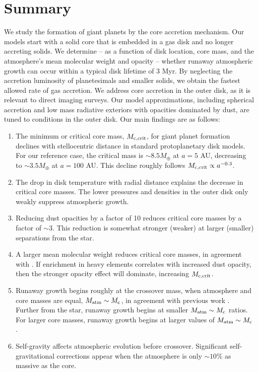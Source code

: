 \documentclass[apj, numberedappendix]{emulateapj}
\newcommand{\co}{_{\rm c}}
\def\crit{_{\rm{c, crit}}}
\begin{document}
\section{Summary} \label{sec:conclusions}

We study the formation of giant planets by the core accretion mechanism.  Our models start with a solid core that is embedded in a gas disk and no longer accreting solids.  We determine -- as a function of disk location, core mass, and the atmosphere's mean molecular weight and opacity -- whether runaway atmospheric growth can occur within a typical disk lifetime of 3 Myr.  By neglecting the accretion luminosity of planetesimals and smaller solids, we obtain the fastest allowed rate of gas accretion.  We address core accretion in the outer disk, as it is relevant to direct imaging surveys.  Our model approximations, including spherical accretion and low mass radiative exteriors with opacities dominated by dust, are tuned to conditions in the outer disk.   Our main findings are as follows:

\begin{enumerate}
\item The minimum or critical core mass, $M\crit$, for giant planet formation declines with stellocentric distance in standard protoplanetary disk models.  For our reference case, the critical mass is $\sim$$8.5 M_{\oplus}$ at $a = 5$ AU, decreasing to $\sim$$3.5 M_{\oplus}$ at $a =100$ AU.  This decline roughly follows $M\crit \propto a^{-0.3}$.

\item The drop in disk temperature with radial distance explains the decrease in critical core masses.  The lower pressures and densities in the outer disk only weakly suppress atmospheric growth.

\item Reducing dust opacities by a factor of 10 reduces critical core masses by a factor of $\sim$$3$.  This reduction is somewhat stronger (weaker) at larger (smaller) separations from the star.

\item A larger mean molecular weight reduces critical core masses, in agreement with \citet{HorIko11}.  If enrichment in heavy elements correlates with increased dust opacity, then the stronger opacity effect will dominate, increasing $M\crit$.

\item Runaway growth begins roughly at the crossover mass, when atmosphere and core masses are equal, $M_{\rm atm} \sim M\co$, in agreement with previous work \citep{pollack96}.  Further from the star, runaway growth begins at smaller $M_{\rm atm} \sim M\co$ ratios.  For larger core masses, runaway growth begins at larger values of $M_{\rm atm} \sim M\co$.

\item Self-gravity affects atmospheric evolution before crossover.  Significant self-gravitational corrections appear when the atmosphere is only $\sim$$10 \%$ as massive as the core.

\end{enumerate}
\end{document}
